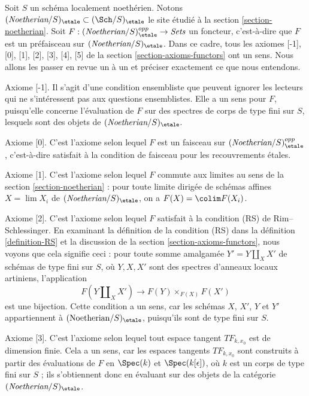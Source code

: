 \noindent
Soit $S$ un schéma localement noethérien. Notons
$(\textit{Noetherian}/S)_\etale \subset (\Sch/S)_\etale$
le site étudié à la section \ref{section-noetherian}. Soit
$F : (\textit{Noetherian}/S)_\etale^{opp} \to \textit{Sets}$ un foncteur,
c'est-à-dire que $F$ est un préfaisceau sur
$(\textit{Noetherian}/S)_\etale$. Dans ce cadre, tous les axiomes [-1], [0],
[1], [2], [3], [4], [5] de la section \ref{section-axioms-functors} ont un
sens. Nous allons les passer en revue un à un et préciser exactement ce que
nous entendons.

\medskip\noindent
Axiome [-1]. Il s'agit d'une condition ensembliste que peuvent ignorer les
lecteurs qui ne s'intéressent pas aux questions ensemblistes. Elle a un
sens pour $F$, puisqu'elle concerne l'évaluation de $F$ sur des spectres de
corps de type fini sur $S$, lesquels sont des objets de
$(\textit{Noetherian}/S)_\etale$.

\medskip\noindent
Axiome [0]. C'est l'axiome selon lequel $F$ est un faisceau sur
$(\textit{Noetherian}/S)_\etale^{opp}$, c'est-à-dire satisfait à la condition
de faisceau pour les recouvrements étales.

\medskip\noindent
Axiome [1]. C'est l'axiome selon lequel $F$ commute aux limites au sens de la
section \ref{section-noetherian} : pour toute limite dirigée de schémas affines
$X = \lim X_i$ de $(\textit{Noetherian}/S)_\etale$, on a
$F(X) = \colim F(X_i)$.

\medskip\noindent
Axiome [2]. C'est l'axiome selon lequel $F$ satisfait à la condition (RS) de
Rim--Schlessinger. En examinant la définition de la condition (RS) dans la
définition \ref{definition-RS} et la discussion de la section
\ref{section-axioms-functors}, nous voyons que cela signifie ceci : pour toute
somme amalgamée $Y' = Y \amalg_X X'$ de schémas de type fini sur $S$, où
$Y, X, X'$ sont des spectres d'anneaux locaux artiniens, l'application
$$
F(Y \amalg_X X') \to F(Y) \times_{F(X)} F(X')
$$
est une bijection. Cette condition a un sens, car les schémas $X$, $X'$, $Y$
et $Y'$ appartiennent à $(\text{Noetherian}/S)_\etale$, puisqu'ils sont de type
fini sur $S$.

\medskip\noindent
Axiome [3]. C'est l'axiome selon lequel tout espace tangent $TF_{k, x_0}$ est
de dimension finie. Cela a un sens, car les espaces tangents $TF_{k, x_0}$ sont
construits à partir des évaluations de $F$ en $\Spec(k)$ et
$\Spec(k[\epsilon])$, où $k$ est un corps de type fini sur $S$ ; ils
s'obtiennent donc en évaluant sur des objets de la catégorie
$(\textit{Noetherian}/S)_\etale$.

